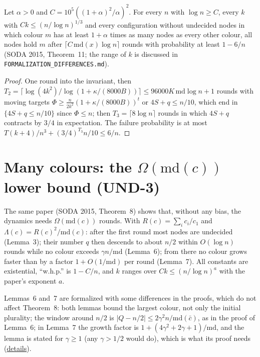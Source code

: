 \begin{theorem}\label{thm:plurality}
\leanok{}
Let $\alpha>0$ and $C=10^5((1+\alpha)^2/\alpha)^2$. For every $n$ with $\log n\ge C$, every $k$
with $Ck\le(n/\log n)^{1/3}$ and every configuration without undecided nodes in which colour $m$
has at least $1+\alpha$ times as many nodes as every other colour, all nodes hold $m$ after
$\lceil C\,\mathrm{md}(x)\log n\rceil$ rounds with probability at least $1-6/n$ (SODA 2015,
Theorem~11; the range of $k$ is discussed in \texttt{FORMALIZATION\_DIFFERENCES.md}).
\end{theorem}
\begin{proof}\leanok
One round into the invariant, then $T_2=\lceil\log(4k^2)/\log(1+\kappa/(8000B))\rceil\le
96000K\,\mathrm{md}\log n+1$ rounds with moving targets $\Phi\ge\frac n{2k^2}(1+\kappa/(8000B))^t$
or $4S+q\le n/10$, which end in $\{4S+q\le n/10\}$ since $\Phi\le n$; then
$T_3=\lceil 8\log n\rceil$ rounds in which $4S+q$ contracts by $3/4$ in expectation. The failure
probability is at most $T(k+4)/n^3+(3/4)^{T_3}n/10\le 6/n$.
\end{proof}

\section{Many colours: the \texorpdfstring{$\Omega(\mathrm{md}(c))$}{Omega(md(c))} lower bound (UND-3)}\label{sec:bcnps-lower-bound}
The same paper (SODA 2015, Theorem~8) shows that, without any bias, the dynamics needs
$\Omega(\mathrm{md}(c))$ rounds. With $R(c)=\sum_i c_i/c_1$ and $\Lambda(c)=R(c)^2/\mathrm{md}(c)$:
after the first round most nodes are undecided (Lemma~3); their number $q$ then descends to about
$n/2$ within $O(\log n)$ rounds while no colour exceeds $\gamma n/\mathrm{md}$ (Lemma~6); from
there no colour grows faster than by a factor $1+O(1/\mathrm{md})$ per round (Lemma~7). All
constants are existential, ``w.h.p.'' is $1-C/n$, and $k$ ranges over $Ck\le(n/\log n)^{a}$ with
the paper's exponent $a$.

Lemmas~6 and~7 are formalized with some differences in the proofs, which do not affect
Theorem~8: both lemmas bound the largest colour, not only the initial plurality; the window around
$n/2$ is $|Q-n/2|\le 2\gamma^2n/\mathrm{md}(\bar c)$, as in the proof of Lemma~6; in Lemma~7 the
growth factor is $1+(4\gamma^2+2\gamma+1)/\mathrm{md}$, and the lemma is stated for $\gamma\ge1$
(any $\gamma>1/2$ would do), which is what its proof needs
(\href{https://github.com/formal-dynamics/leanamics/blob/main/undecided/FORMALIZATION_DIFFERENCES.md#the-lower-bound-with-k-colours-lowerbound-roadmap-und-3}{details}).

